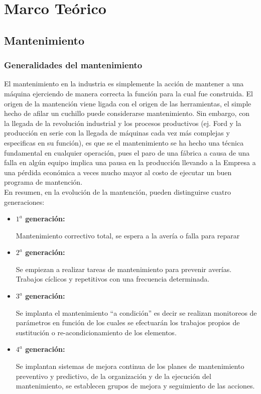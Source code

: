 \chapter{Marco Teórico}
	\section{Mantenimiento}
		\subsection{Generalidades del mantenimiento}
			El mantenimiento en la industria es simplemente la acción de mantener a una máquina ejerciendo de manera correcta la función para la cual fue construida. El origen de la mantención viene ligada con el origen de las herramientas, el simple hecho de afilar un cuchillo puede considerarse mantenimiento. Sin embargo, con la llegada de la revolución industrial y los procesos productivos (ej. Ford y la producción en serie con la llegada de máquinas cada vez más complejas y especificas en su función), es que se el mantenimiento se ha hecho una técnica fundamental en cualquier operación, pues el paro de una fábrica a causa de una falla en algún equipo implica una pausa en la producción llevando a la Empresa a una pérdida económica a veces mucho mayor al costo de ejecutar un buen programa de mantención. \\
			
			En resumen, en la evolución de la mantención, pueden distinguirse cuatro generaciones:
			\begin{itemize}
				\item {\textbf{\textit{${1^a}$} generación:}}
				
				 Mantenimiento correctivo total, se espera a la avería o falla para reparar
				 
				\item{\textbf{\textit{${2^a}$} generación:}}
				
				Se empiezan a realizar tareas de mantenimiento para prevenir averías. Trabajos cíclicos y repetitivos con una frecuencia determinada.
				
				\item {\textbf{\textit{${3^a}$} generación:}}
				
				Se implanta el mantenimiento “a condición” es decir se realizan monitoreos de parámetros en función de los cuales se efectuarán los trabajos propios de sustitución o re-acondicionamiento de los elementos.
				
				\item {\textbf{\textit{${4^a}$} generación:}}
				
				Se implantan sistemas de mejora continua de los planes de mantenimiento preventivo y predictivo, de la organización y de la ejecución del mantenimiento, se establecen grupos de mejora y seguimiento de las acciones.
				
								
			\end{itemize}
		
